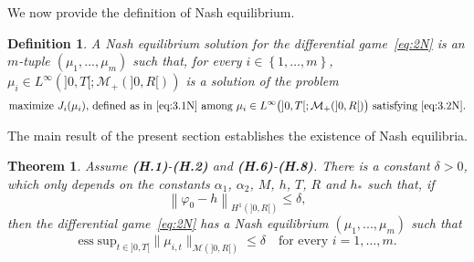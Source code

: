 \documentclass[11pt,leqno]{amsart}
\newtheorem{theorem}{Theorem}[section]
\newtheorem{definition}{Definition}[section]
\numberwithin{equation}{section}
\begin{document}
We now provide the definition of Nash equilibrium. 
\begin{definition}
  \label{def:solN}
  A Nash equilibrium solution for the differential game~\eqref{eq:2N}
  is an $m$-tuple $(\mu_1,..., \mu_m)$ such that, for every
  $i \in \left\{1, \ldots, m\right\}$, $\mu_i
  \in L^\infty(]0,T[; {\mathcal M}_+(]0,R[))$ is
  a solution of the problem
  \begin{equation*}
    \text{maximize $J_i(\mu_i)$, defined as in~\eqref{eq:3.1N} among
      $\mu_i \in L^\infty \big(]0, T[; \mathcal M_+ (]0, R[) \big)$
      satisfying~\eqref{eq:3.2N}}.
  \end{equation*}
\end{definition}
The main result of the present section establishes the existence of Nash equilibria. 
\begin{theorem}
\label{th:mainNash}
Assume {\bf (H.1)}-{\bf (H.2)} and {\bf (H.6)}-{\bf (H.8)}.  There is a constant $\delta>0$, which only depends on the constants $\alpha_1$, $\alpha_2$, $M$, $h$, $T$, $R$ and $h_\ast$ such that, if\begin{equation}
\label{eq:initassN}
{\left\|{{\varphi}_0-h}\right\|}_{H^1(]0,R[)}\le \delta,
\end{equation}
then the differential game~\eqref{eq:2N} has a Nash equilibrium $(\mu_1,...,\mu_m)$ such that 
\begin{equation}
\label{eq:measassN}
\mathrm{ess \; sup}_{t \in ]0, T[} \| \mu_{i, t} \|_{\mathcal M(]0, R[)} \leq \delta
\quad \text{for every $i=1, \dots, m$.}
\end{equation}
\end{theorem}
\end{document}
